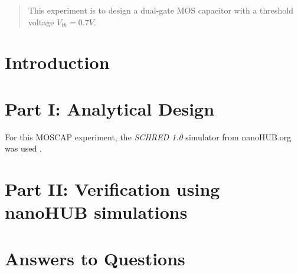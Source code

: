 \documentclass{IEEEtran}
\title{}
\author{Chase A. Lotito, \textit{SIUC Undergraduate}}
\date{}
\begin{document}
\maketitle %

\begin{abstract}
    This experiment is to design a dual-gate MOS capacitor with a threshold voltage \(V_{th} = 0.7V\).     
\end{abstract}

\section*{Introduction}



\section*{Part I: Analytical Design}

For this MOSCAP experiment, the \textit{SCHRED 1.0} simulator from nanoHUB.org was used \cite{sim}.

\section*{Part II: Verification using nanoHUB simulations}

\section*{Answers to Questions}



\end{document}
